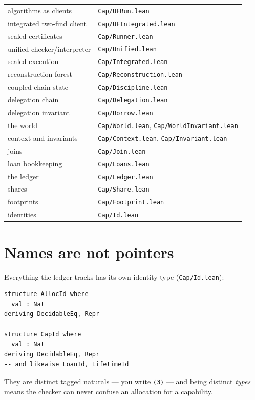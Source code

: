 \documentclass[10pt,a4paper]{article}
\newcommand{\file}[1]{\texttt{#1}}
\newcommand{\lean}[1]{\texttt{#1}}
\begin{document}
\begin{center}\footnotesize\ttfamily
\begin{tabular}{ll}
\toprule
algorithms as clients & \file{Cap/UFRun.lean} \\
integrated two-find client & \file{Cap/UFIntegrated.lean} \\
sealed certificates & \file{Cap/Runner.lean} \\
unified checker/interpreter & \file{Cap/Unified.lean} \\
sealed execution & \file{Cap/Integrated.lean} \\
reconstruction forest & \file{Cap/Reconstruction.lean} \\
coupled chain state & \file{Cap/Discipline.lean} \\
delegation chain & \file{Cap/Delegation.lean} \\
delegation invariant & \file{Cap/Borrow.lean} \\
the world & \file{Cap/World.lean}, \file{Cap/WorldInvariant.lean} \\
context and invariants & \file{Cap/Context.lean}, \file{Cap/Invariant.lean} \\
joins & \file{Cap/Join.lean} \\
loan bookkeeping & \file{Cap/Loans.lean} \\
the ledger & \file{Cap/Ledger.lean} \\
shares & \file{Cap/Share.lean} \\
footprints & \file{Cap/Footprint.lean} \\
identities & \file{Cap/Id.lean} \\
\bottomrule
\end{tabular}
\end{center}

\section{Names are not pointers}

Everything the ledger tracks has its own identity type (\file{Cap/Id.lean}):

\begin{lstlisting}
structure AllocId where
  val : Nat
deriving DecidableEq, Repr

structure CapId where
  val : Nat
deriving DecidableEq, Repr
-- and likewise LoanId, LifetimeId
\end{lstlisting}

They are distinct tagged naturals --- you write \lean{⟨3⟩} --- and being distinct
\emph{types} means the checker can never confuse an allocation for a capability.
\end{document}
